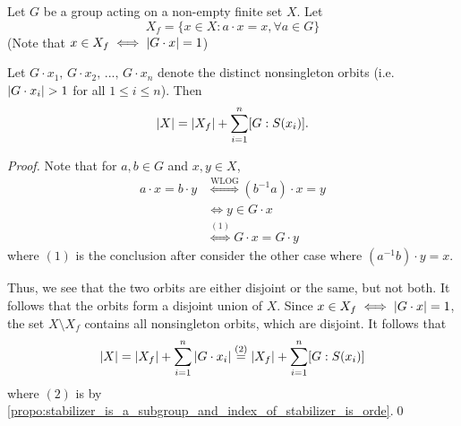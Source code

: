 \begin{thm}
\label{thm:orbit_decomposition_theorem}
  Let $G$ be a group acting on a non-empty finite set $X$. Let
  \begin{equation*}
    X_f = \{x \in X : a \cdot x = x, \forall a \in G \}
  \end{equation*}
  (Note that $x \in X_f \iff \left|G \cdot x\right| = 1$)

  Let $G \cdot x_1, \, G \cdot x_2, \, ..., \, G \cdot x_n$ denote the distinct nonsingleton orbits (i.e. $\left|G \cdot x_i\right| > 1$ for all $1 \leq i \leq n$). Then
  \begin{equation*}
    \left|X\right| = \left|X_f\right| + \sum_{i = 1}^{n} [ G : S(x_i) ].
  \end{equation*}
\end{thm}

\begin{proof}
  Note that for $a, b \in G$ and $x, y \in X$,
  \begin{align*}
    a \cdot x = b \cdot y &\overset{\text{WLOG}}{\iff} (b^{-1}a) \cdot x = y \\
          &\iff y \in G \cdot x \\
          &\overset{(1)}{\iff} G \cdot x = G \cdot y
  \end{align*}
  where $(1)$ is the conclusion after consider the other case where $(a^{-1}b) \cdot y = x$.

  Thus, we see that the two orbits are either disjoint or the same, but not both. It follows that the orbits form a disjoint union of $X$. Since  $x \in X_f \iff \left|G \cdot x\right| = 1$, the set $X \setminus X_f$ contains all nonsingleton orbits, which are disjoint. It follows that
  \begin{equation*}
    \left|X\right| = \left|X_f\right| + \sum_{i = 1}^{n} \left|G \cdot x_i\right| \overset{(2)}{=} \left|X_f\right| + \sum_{i = 1}^{n} [G : S(x_i)]
  \end{equation*}
  where $(2)$ is by \cref{propo:stabilizer_is_a_subgroup_and_index_of_stabilizer_is_orde}.\qed
\end{proof}



